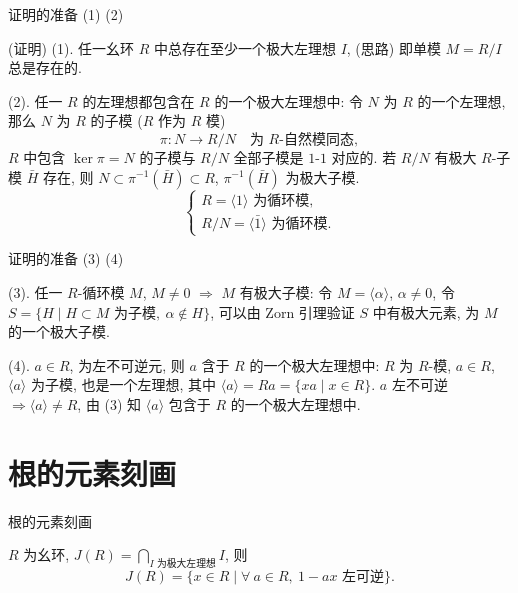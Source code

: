 \begin{frame}{证明的准备 (1) (2)}

\startproof[bg=yellow, fg=red](证明)
(1). 任一幺环 $R$ 中总存在至少一个极大左理想 $I$,
(思路) 即单模 $M = R/I$ 总是存在的.

\pause

(2). 任一 $R$ 的左理想都包含在 $R$ 的一个极大左理想中:
令 $N$ 为 $R$ 的一个左理想, 那么 $N$ 为 $R$ 的子模 ($R$ 作为 $R$ 模)
\[
\pi: N \to R/N \quad \text{为 } R\text{-自然模同态},
\]
$R$ 中包含 $\ker \pi = N$ 的子模与 $R/N$ 全部子模是 $1$-$1$ 对应的.
若 $R/N$ 有极大 $R$-子模 $\bar{H}$ 存在,
则 $N \subset \pi^{-1}(\bar{H}) \subset R$, $\pi^{-1}(\bar{H})$ 为极大子模.
\[
\begin{cases}
R = \langle 1 \rangle \text{ 为循环模}, \\
R/N = \langle \bar{1} \rangle \text{ 为循环模}.
\end{cases}
\]

\end{frame}


\begin{frame}{证明的准备 (3) (4)}

(3). 任一 $R$-循环模 $M$, $M \neq 0$ $\Longrightarrow$ $M$ 有极大子模:
令 $M = \langle \alpha \rangle$, $\alpha \neq 0$,
令 $S = \{ H \mid H \subset M \text{ 为子模},\ \alpha \notin H \}$,
可以由 Zorn 引理验证 $S$ 中有极大元素, 为 $M$ 的一个极大子模.

\pause

(4). $a \in R$, 为左不可逆元, 则 $a$ 含于 $R$ 的一个极大左理想中:
$R$ 为 $R$-模, $a \in R$, $\langle a \rangle$ 为子模, 也是一个左理想,
其中 $\langle a \rangle = Ra = \{ xa \mid x \in R \}$.
$a$ 左不可逆 $\Longrightarrow \langle a \rangle \neq R$,
由 (3) 知 $\langle a \rangle$ 包含于 $R$ 的一个极大左理想中.

\end{frame}


\section[根的元素刻画]{根的元素刻画}


\begin{frame}{根的元素刻画}

\begin{lem}[根的元素刻画]
$R$ 为幺环, $J(R) = \bigcap\limits_{I \text{ 为极大左理想}} I$,
则
\[
J(R) = \big\{ x \in R \;\big|\; \forall\ a \in R,\ 1 - ax \text{ 左可逆} \big\} .
\]
\end{lem}

\end{frame}


